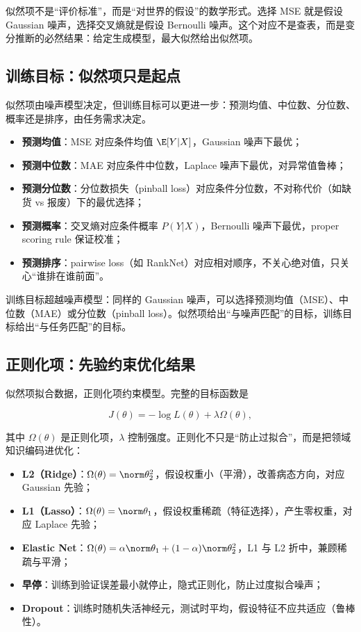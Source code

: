似然项不是``评价标准''，而是``对世界的假设''的数学形式。选择 MSE 就是假设 Gaussian 噪声，选择交叉熵就是假设 Bernoulli 噪声。这个对应不是查表，而是变分推断的必然结果：给定生成模型，最大似然给出似然项。

\subsection{训练目标：似然项只是起点}

似然项由噪声模型决定，但训练目标可以更进一步：预测均值、中位数、分位数、概率还是排序，由任务需求决定。

\begin{itemize}
\tightlist
\item
  \textbf{预测均值}：MSE 对应条件均值 $\E[Y|X]$，Gaussian 噪声下最优；
\item
  \textbf{预测中位数}：MAE 对应条件中位数，Laplace 噪声下最优，对异常值鲁棒；
\item
  \textbf{预测分位数}：分位数损失（pinball loss）对应条件分位数，不对称代价（如缺货 vs 报废）下的最优选择；
\item
  \textbf{预测概率}：交叉熵对应条件概率 $P(Y|X)$，Bernoulli 噪声下最优，proper scoring rule 保证校准；
\item
  \textbf{预测排序}：pairwise loss（如 RankNet）对应相对顺序，不关心绝对值，只关心``谁排在谁前面''。
\end{itemize}

训练目标超越噪声模型：同样的 Gaussian 噪声，可以选择预测均值（MSE）、中位数（MAE）或分位数（pinball loss）。似然项给出``与噪声匹配''的目标，训练目标给出``与任务匹配''的目标。

\subsection{正则化项：先验约束优化结果}

似然项拟合数据，正则化项约束模型。完整的目标函数是

\[
J(\theta)=-\log L(\theta)+\lambda\Omega(\theta),
\]

其中 $\Omega(\theta)$ 是正则化项，$\lambda$ 控制强度。正则化不只是``防止过拟合''，而是把领域知识编码进优化：

\begin{itemize}
\tightlist
\item
  \textbf{L2（Ridge）}：$\Omega(\theta)=\norm\theta_2^2$，假设权重小（平滑），改善病态方向，对应 Gaussian 先验；
\item
  \textbf{L1（Lasso）}：$\Omega(\theta)=\norm\theta_1$，假设权重稀疏（特征选择），产生零权重，对应 Laplace 先验；
\item
  \textbf{Elastic Net}：$\Omega(\theta)=\alpha\norm\theta_1+(1-\alpha)\norm\theta_2^2$，L1 与 L2 折中，兼顾稀疏与平滑；
\item
  \textbf{早停}：训练到验证误差最小就停止，隐式正则化，防止过度拟合噪声；
\item
  \textbf{Dropout}：训练时随机失活神经元，测试时平均，假设特征不应共适应（鲁棒性）。
\end{itemize}

